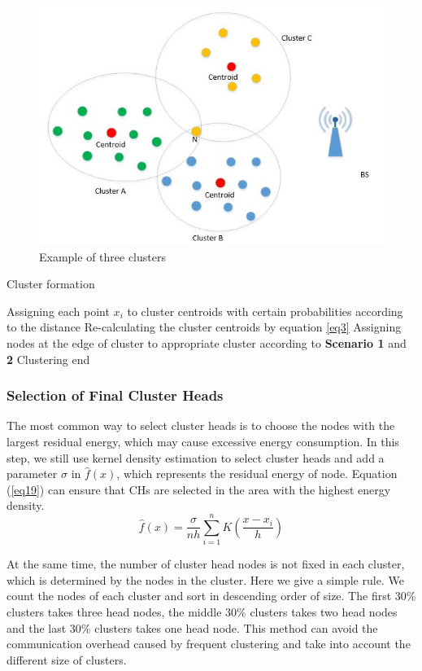 \documentclass[11pt]{report}
\begin{document}
 	\begin{figure}[h!]
 		\centering
 		\includegraphics[width=0.6\linewidth]{threeedge.jpg}
 		\caption{Example of three clusters}
 		\label{fig6}
 	\end{figure}
	
	 \begin{algorithm}[H]
	 	\caption{Cluster formation}
	 	\LinesNumbered %
	 	{Assigning each point $x_i$ to cluster centroids with certain probabilities according to the distance\;
	 	Re-calculating the cluster centroids by equation \ref{eq3}\;}
 	    Assigning nodes at the edge of cluster to appropriate cluster according to \textbf{Scenario 1} and \textbf{2}\;
 	    Clustering end 	
	 \end{algorithm}
 
	\subsubsection{Selection of Final Cluster Heads}
	The most common way to select cluster heads is to choose the nodes with the largest residual energy, which may cause excessive energy consumption. In this step, we still use kernel density estimation to select cluster heads and add a parameter $\sigma$ in $\hat{f}(x)$, which represents the residual energy of node. Equation (\ref{eq19}) can ensure that CHs are selected in the area with the highest energy density.\\
	\begin{equation}
	\label{eq19}
	\hat{f}(x) = \frac{\sigma}{nh} \sum_{i=1}^{n}K\left(\frac{x-x_i}{h}\right)
	\end{equation}
	
	At the same time, the number of cluster head nodes is not fixed in each cluster, which is determined by the nodes in the cluster. Here we give a simple rule. We count the nodes of each cluster and sort in descending order of size. The first 30\% clusters takes three head nodes, the middle 30\% clusters takes two head nodes and the last 30\% clusters takes one head node. This method can avoid the communication overhead caused by frequent clustering and take into account the different size of clusters.
	
\end{document}
